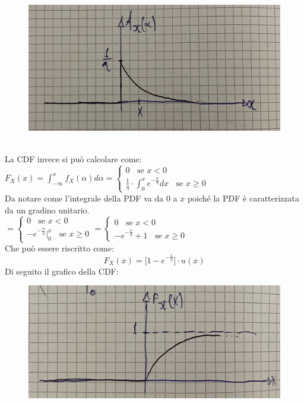 \documentclass{article}
\begin{document}
\begin{figure}[ht]
\centering
\includegraphics[scale=0.12]{images/35.PDF_VA_exp.jpeg}
\end{figure} ~\\
La CDF invece si può calcolare come: \\
$F_X(x) = \int_{- \infty}^{x} f_X(\alpha) d\alpha = 
\begin{cases}
0 \;\;\text{ se } x<0 \\
\frac 1 \eta \cdot \int_{0}^{x}e^{- \frac \alpha \eta} dx \;\;\text{ se } x \geq 0
\end{cases}$ \\
Da notare come l’integrale della PDF va da $0$ a $x$ poiché la PDF è caratterizzata da un gradino unitario. \\
$= 
\begin{cases}
0 \;\;\text{ se } x<0 \\
-e^{- \frac \alpha \eta} \Big|_{0}^{x} \;\;\text{ se } x \geq 0
\end{cases}
=
\begin{cases}
0 \;\;\text{ se } x<0 \\
-e^{- \frac x \eta} +1 \;\;\text{ se } x \geq 0
\end{cases}$ \\
Che può essere riscritto come: 
\[F_X(x) = \Big[1 - e^{-\frac x \eta }\Big] \cdot u(x)\]
Di seguito il grafico della CDF:
\begin{figure}[ht]
\centering
\includegraphics[scale=0.10]{images/36.CDF_VA_exp.jpeg}
\end{figure}
\end{document}

